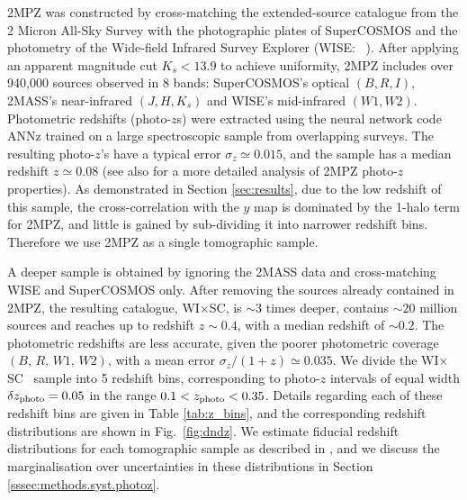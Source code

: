 \documentclass[useAMS,usenatbib]{mn2e}
\newcommand{\wisc}{WI$\times$SC}
\def\citejap#1{\citeauthor{#1}\ \citeyear{#1}}
\begin{document}
    2MPZ was constructed by cross-matching the extended-source catalogue from the 2 Micron All-Sky Survey \citep[2MASS,][]{2006AJ....131.1163S,2000AJ....119.2498J} with the photographic plates of SuperCOSMOS \citep{2001MNRAS.326.1295H,2016MNRAS.462.2085P} and the photometry of the Wide-field Infrared Survey Explorer (WISE: \citejap{2010AJ....140.1868W}). After applying an apparent magnitude cut $K_s<13.9$ to achieve uniformity, 2MPZ includes over 940,000 sources observed in 8 bands: SuperCOSMOS's optical $(B,R,I)$, 2MASS's near-infrared $(J,H,K_s)$ and WISE's mid-infrared $(W1,W2)$. Photometric redshifts (photo-$z$s) were extracted using the neural network code ANNz \citep{2004PASP..116..345C} trained on a large spectroscopic sample from overlapping surveys. The resulting photo-$z$'s have a typical error $\sigma_z\simeq0.015$, and the sample has a median redshift $z\simeq0.08$ (see also \citealt{2018MNRAS.476.1050B} for a more detailed analysis of 2MPZ photo-$z$ properties). As demonstrated in Section \ref{sec:results}, due to the low redshift of this sample, the cross-correlation with the $y$ map is dominated by the 1-halo term for 2MPZ, and little is gained by sub-dividing it into narrower redshift bins. Therefore we use 2MPZ as a single tomographic sample.
    
    A deeper sample is obtained by ignoring the 2MASS data and cross-matching WISE and SuperCOSMOS only. After removing the sources already contained in 2MPZ, the resulting catalogue, \wisc, is $\sim3$ times deeper, contains $\sim20$ million sources and reaches up to redshift $z\sim0.4$, with a median redshift of $\sim0.2$. The photometric redshifts are less accurate, given the poorer photometric coverage $(B,\,R,\,W1,\,W2)$, with a mean error $\sigma_z/(1+z)\simeq0.035$. We divide the \wisc~ sample into 5 redshift bins, corresponding to photo-$z$ intervals of equal width $\delta z_{\rm photo}=0.05$ in the range $0.1<z_{\rm photo}<0.35$. Details regarding each of these redshift bins are given in Table \ref{tab:z_bins}, and the corresponding redshift distributions are shown in Fig.\!~\ref{fig:dndz}. We estimate fiducial redshift distributions for each tomographic sample as described in \cite{2018MNRAS.481.1133P}, and we discuss the marginalisation over uncertainties in these distributions in Section \ref{sssec:methods.syst.photoz}.
\end{document}
